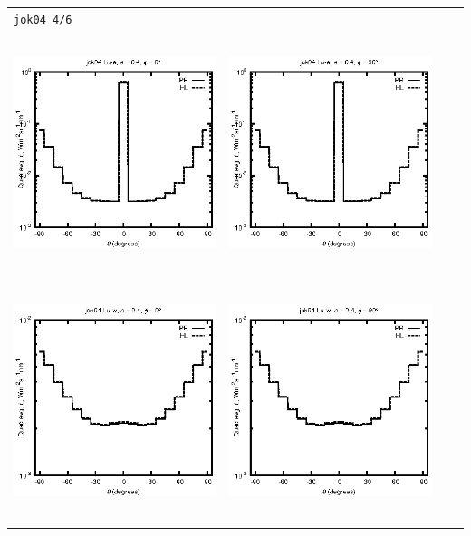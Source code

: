 \documentclass[10pt,a4paper]{article}
\begin{document}
\begin{adjustwidth}{-1.2in}{-1.2in}
\begin{tabular}{c c c c}
\multicolumn{4}{l}{\texttt{jok04 4/6}} \\
\includegraphics[height=7cm]{../eps/jok04_Lu_a_fwd.eps} &
\includegraphics[height=7cm]{../eps/jok04_Lu_a_cross.eps}\\
\includegraphics[height=7cm]{../eps/jok04_Lu_w_fwd.eps} &
\includegraphics[height=7cm]{../eps/jok04_Lu_w_cross.eps} \\

\end{tabular}
\end{adjustwidth}
\end{document}
